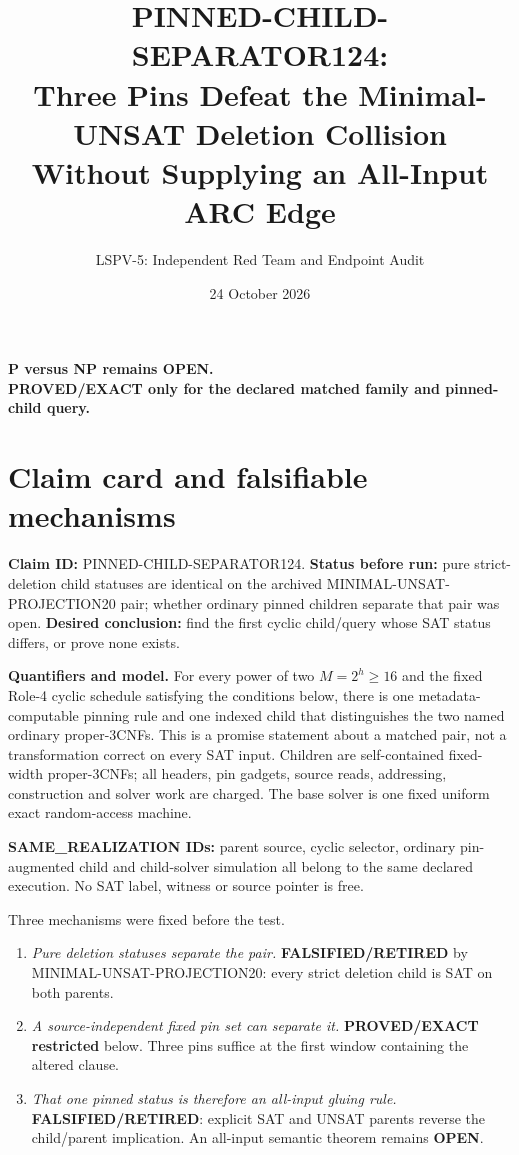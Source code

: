 \documentclass[11pt]{article}
\title{PINNED-CHILD-SEPARATOR124:\\
Three Pins Defeat the Minimal-UNSAT Deletion Collision\\
Without Supplying an All-Input ARC Edge}
\author{LSPV-5: Independent Red Team and Endpoint Audit}
\date{24 October 2026}
\newcommand{\OPEN}{\textbf{OPEN}}
\begin{document}
\maketitle

\begin{center}
\textbf{P versus NP remains OPEN.}\\
\textbf{PROVED/EXACT only for the declared matched family and pinned-child query.}
\end{center}

\section{Claim card and falsifiable mechanisms}
\noindent\textbf{Claim ID:} PINNED-CHILD-SEPARATOR124.  \textbf{Status before
run:} pure strict-deletion child statuses are identical on the archived
MINIMAL-UNSAT-PROJECTION20 pair; whether ordinary pinned children separate
that pair was open.  \textbf{Desired conclusion:} find the first cyclic
child/query whose SAT status differs, or prove none exists.

\noindent\textbf{Quantifiers and model.}  For every power of two
$M=2^h\ge16$ and the fixed Role-4 cyclic schedule satisfying the conditions
below, there is one metadata-computable pinning rule and one indexed child
that distinguishes the two named ordinary proper-3CNFs.  This is a promise
statement about a matched pair, not a transformation correct on every SAT
input.  Children are self-contained fixed-width proper-3CNFs; all headers,
pin gadgets, source reads, addressing, construction and solver work are
charged.  The base solver is one fixed uniform exact random-access machine.

\noindent\textbf{SAME\_REALIZATION IDs:} parent source, cyclic selector,
ordinary pin-augmented child and child-solver simulation all belong to the
same declared execution.  No SAT label, witness or source pointer is free.

Three mechanisms were fixed before the test.
\begin{enumerate}
\item \emph{Pure deletion statuses separate the pair.}
\textbf{FALSIFIED/RETIRED} by MINIMAL-UNSAT-PROJECTION20: every strict
deletion child is SAT on both parents.
\item \emph{A source-independent fixed pin set can separate it.}
\textbf{PROVED/EXACT restricted} below.  Three pins suffice at the first
window containing the altered clause.
\item \emph{That one pinned status is therefore an all-input gluing rule.}
\textbf{FALSIFIED/RETIRED}: explicit SAT and UNSAT parents reverse the
child/parent implication.  An all-input semantic theorem remains \OPEN{}.
\end{enumerate}
\end{document}
